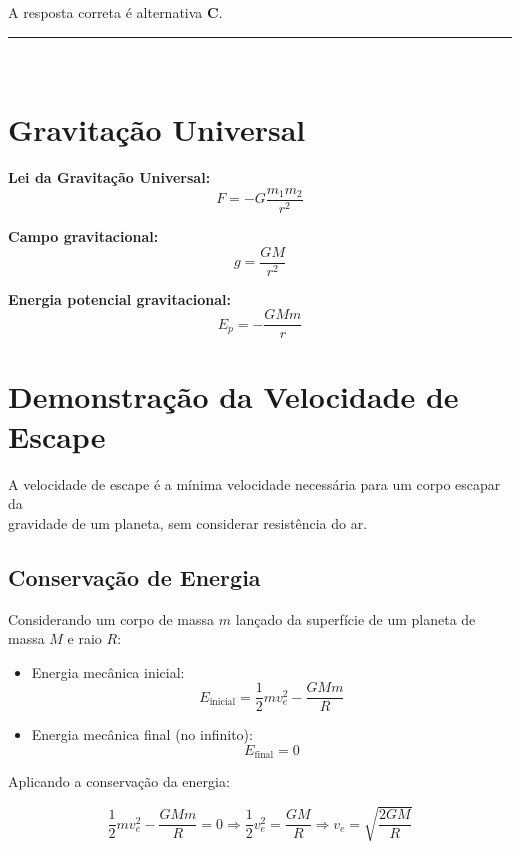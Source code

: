 \begin{flushleft}
A resposta correta é alternativa \colorbox{green!50}{\textbf{C}}.
\end{flushleft}

\noindent\rule{\linewidth}{0.6pt}\\

\section*{Gravitação Universal}

\textbf{Lei da Gravitação Universal:}
\begin{equation*}
  F = -G \frac{m_1 m_2}{r^2}
\end{equation*}

\textbf{Campo gravitacional:}
\begin{equation*}
  g = \frac{G M}{r^2}
\end{equation*}

\textbf{Energia potencial gravitacional:}
\begin{equation*}
  E_p = -\frac{G M m}{r}
\end{equation*}

\section*{Demonstração da Velocidade de Escape}

\colorbox{green!40}{A velocidade de escape é a mínima velocidade necessária para um corpo escapar da} \\
\colorbox{green!40}{gravidade de um planeta,} sem considerar resistência do ar.

\subsection*{Conservação de Energia}

Considerando um corpo de massa $m$ lançado da superfície de um planeta de massa $M$ e raio $R$:

\begin{itemize}
  \item Energia mecânica inicial:
  \[
  E_{\text{inicial}} = \frac{1}{2}mv^{2}_{e} - \frac{GMm}{R}
  \]
  \item Energia mecânica final (no infinito): 
  \[
  E_{\text{final}} = 0
  \]
\end{itemize}

Aplicando a conservação da energia:

\[
\frac{1}{2}mv^2_{e} - \frac{GMm}{R} = 0
\Rightarrow \frac{1}{2}v^2_{e} = \frac{GM}{R}
\Rightarrow v_{e} = \sqrt{\frac{2GM}{R}}
\]

